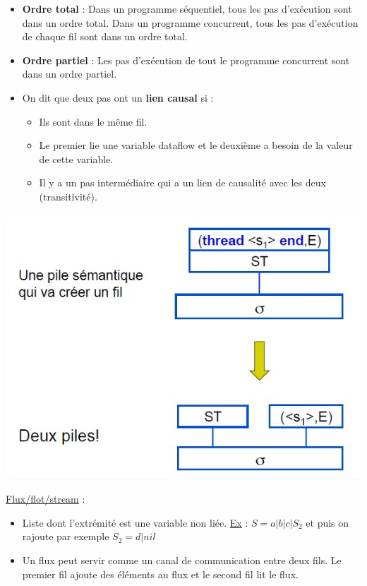 \documentclass[fr,license=none]{../../../eplsummary}
\begin{document}
\begin{flushleft}
\begin{itemize}
\item \textbf{Ordre total} : Dans un programme séquentiel, tous les pas d'exécution sont dans un ordre total. Dans un programme concurrent, tous les pas d'exécution de chaque fil sont dans un ordre total.
\item \textbf{Ordre partiel} : Les pas d'exécution de tout le programme concurrent sont dans un ordre partiel.
\item On dit que deux pas ont un \textbf{lien causal} si :
\begin{itemize}[label=\textbullet]
\item Ils sont dans le même fil.
\item Le premier lie une variable dataflow et le deuxième a besoin de la valeur de cette variable.
\item Il y a un pas intermédiaire qui a un lien de causalité avec les deux (transitivité).
\end{itemize}
\end{itemize}
\begin{center}
\includegraphics[scale=0.35]{PileS.jpg}
\end{center}
\bigbreak



\textcolor{mauvedef}{\underline{Flux/flot/stream}} : 
\begin{itemize}
\item Liste dont l'extrémité est une variable non liée. \underline{Ex} : $S=a|b|c|S_2$ et puis on rajoute par exemple $S_2=d|nil$
\item Un flux peut servir comme un canal de communication entre deux fils. Le premier fil ajoute des éléments au flux et le second fil lit le flux.
\end{itemize} \bigbreak






\end{flushleft}
\end{document}

